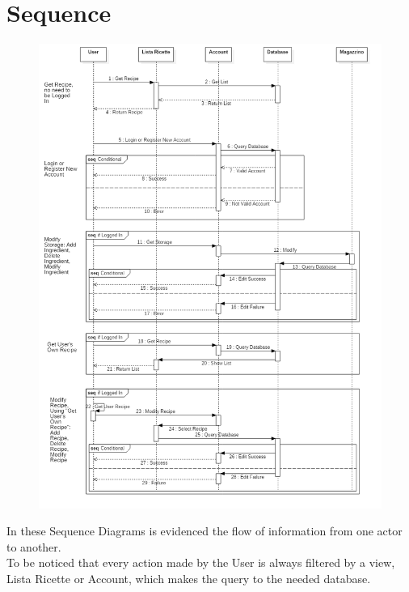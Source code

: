 \documentclass[12pt]{article}
\begin{document}
\section{Sequence}
\begin{figure}[H]
\includegraphics[scale=0.5]{SequenceDiagram1.png}
\centering
\end{figure}
\thispagestyle{empty}
\pagebreak
In these Sequence Diagrams is evidenced the flow of information from one actor to another.\\
To be noticed that every action made by the User is always filtered by a view, Lista Ricette or Account, which makes the query to the needed database.\\
\end{document}
